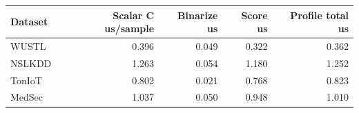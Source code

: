 \begin{tabular}{lrrrr}
\toprule
Dataset & Scalar C us/sample & Binarize us & Score us & Profile total us \\
\midrule
WUSTL & 0.396 & 0.049 & 0.322 & 0.362 \\
NSLKDD & 1.263 & 0.054 & 1.180 & 1.252 \\
TonIoT & 0.802 & 0.021 & 0.768 & 0.823 \\
MedSec & 1.037 & 0.050 & 0.948 & 1.010 \\
\bottomrule
\end{tabular}
